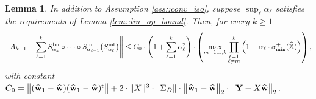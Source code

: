 \documentclass{article}
\newcommand*{\bbX}{\mathbb{X}}
\newcommand*{\bfY}{\mathbf{Y}}
\newcommand*{\bfw}{\mathbf{w}}
\newcommand*{\tran}{^{\mathsf{t}}}
\newcommand*{\sigminp}{\sigma_{\mathrm{min}}^+}
\DeclarePairedDelimiter{\norm}{\lVert}{\rVert}
\newcommand{\whweight}{\widehat{\bfw}}
\newcommand{\whbbX}{\widehat{\bbX}}
\newcommand{\Slin}{S^{\mathrm{lin}}}
\newcommand{\Sint}{S^{\mathrm{int}}}
\newtheorem{lemma}{Lemma}[section]
\begin{document}
\begin{lemma}
  \label{lem::var_ass}
  In addition to Assumption \ref{ass::conv_iso}, suppose $\sup_{\ell}
  \alpha_\ell$ satisfies the requirements of Lemma \ref{lem::lin_op_bound}.
  Then, for every $k \geq 1$ \begin{align*}
    \norm[\Bigg]{A_{k + 1} - \sum_{\ell = 1}^k \Slin_{\alpha_k} \circ \cdots
    \circ \Slin_{\alpha_{\ell + 1}} \big(\Sint_{\alpha_\ell}\big)} \leq
    C_0 \cdot \left(1 + \sum_{\ell = 1}^k \alpha_\ell^2\right)
    \cdot \left(\max_{m = 1 \ldots, k} \prod_{\substack{\ell = 1\\ \ell \neq
    m}}^{k} \Big(1 - \alpha_\ell \cdot \sigminp(\whbbX)\Big)\right),
  \end{align*} with constant $C_0 = \norm[\big]{(\whweight_1 - \whweight)
  (\whweight_1 - \whweight)\tran} + 2 \cdot \norm{X}^3 \cdot \norm{\Sigma_D}
  \cdot \norm[\big]{\whweight_1 - \whweight}_2 \cdot \norm[\big]{\bfY - X
  \whweight}_2$.
\end{lemma}
\end{document}
